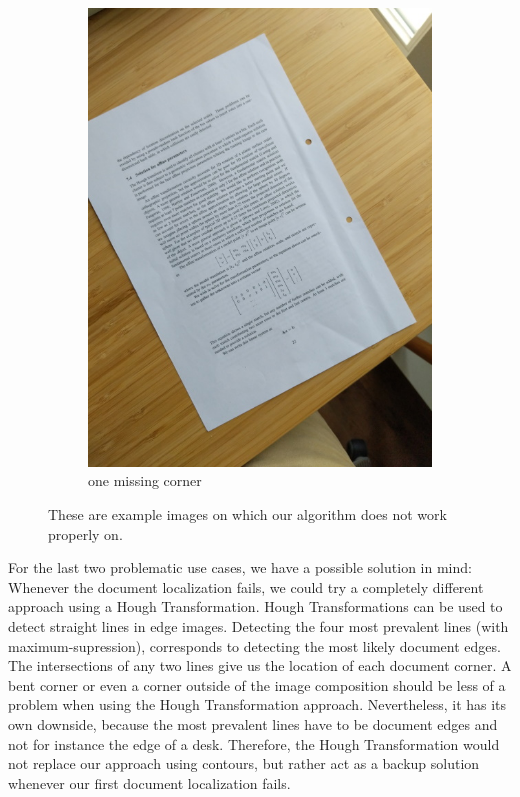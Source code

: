 \documentclass[bibliography=totoc]{scrartcl}
\begin{document}
\begin{figure}[H]
\begin{subfigure}[t]{0.3\linewidth}
		\includegraphics[width=\linewidth]{imgs/not_working/missing_corner.jpg}
		\caption{one missing corner}
		\label{subfig:missing_corner}
	\end{subfigure}
	\caption{These are example images on which our algorithm does not work properly on.}
	\label{fig:known_problems}
\end{figure}

For the last two problematic use cases, we have a possible solution in mind:
Whenever the document localization fails, we could try a completely different approach using a Hough Transformation.
Hough Transformations can be used to detect straight lines in edge images.
Detecting the four most prevalent lines (with maximum-supression), corresponds to detecting the most likely document edges.
The intersections of any two lines give us the location of each document corner.
A bent corner or even a corner outside of the image composition should be less of a problem when using the Hough Transformation approach.
Nevertheless, it has its own downside, because the most prevalent lines have to be document edges and not for instance the edge of a desk.
Therefore, the Hough Transformation would not replace our approach using contours, but rather act as a backup solution whenever our first document localization fails.\\
\end{document}
